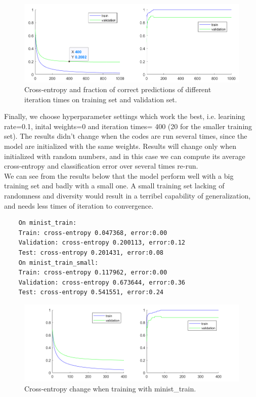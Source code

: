 \documentclass{article}
\begin{document}
\begin{figure}[H]
	\centering
	\includegraphics[scale=0.65]{figure8}
	\caption{Cross-entropy and fraction of correct predictions of different iteration times on training set and validation set.}
	\label{fig8}
\end{figure}

Finally, we choose hyperparameter settings which work the best, i.e. learining rate=0.1, inital weights=0 and iteration times= 400 (20 for the smaller training set). The results didn't change when the codes are run several times, since the model are initialized with the same weights. Results will change only when initialized with random numbers, and in this case we can compute its average cross-entropy and classification error over several times re-run.\\

We can see from the results below that the model perform well with a big training set and badly with a small one. A small training set lacking of randomness and diversity would result in a terribel capability of generalization, and needs less times of iteration to convergence.

\begin{commandline}
	\begin{verbatim}
	On minist_train:
	Train: cross-entropy 0.047368, error:0.00
	Validation: cross-entropy 0.200113, error:0.12
	Test: cross-entropy 0.201431, error:0.08
	On minist_train_small:
	Train: cross-entropy 0.117962, error:0.00
	Validation: cross-entropy 0.673644, error:0.36
	Test: cross-entropy 0.541551, error:0.24
	\end{verbatim}
\end{commandline}

\begin{figure}[H]
	\centering
	\includegraphics[scale=0.7]{figure9}
	\caption{Cross-entropy change when training with minist\_train.}
	\label{fig9}
\end{figure}
\end{document}
